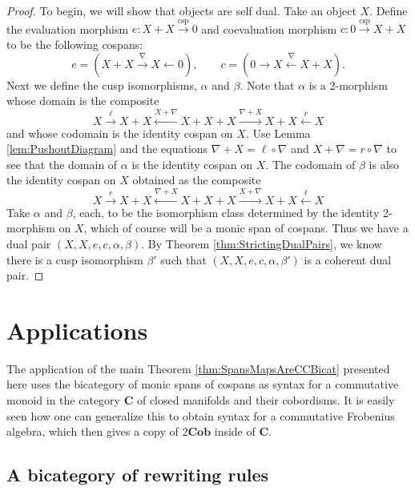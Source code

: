 \documentclass[11pt]{amsart}
\newcommand{\cat}[1]{\mathbf{#1}}
\newcommand{\from}{\colon}
\newcommand{\xto}[1]{\xrightarrow{#1}}
\newcommand{\tocospan}{\xrightarrow{\mathrm{csp}}}
\theoremstyle{remark}
\theoremstyle{definition}
\begin{document}
\begin{proof}
	To begin, we will show that objects are self dual. 
	Take an object $X$.  
	Define the evaluation morphism 
		$e \from X + X \tocospan 0$ 
	and coevaluation morphism 
		$c \from 0 \tocospan X+X$ 
	to be the following cospans:
	\[
		e = (X+X \xto{\nabla} X \gets 0), 
		\quad \quad 
		c = (0 \to X \xleftarrow{\nabla} X+X).
	\]
	Next we define the cusp isomorphisms, 
		$\alpha$ and $\beta$.
	Note that $\alpha$ is a 2-morphism 
	whose domain is the composite 
	\[
		X \xto{\ell}
		X+X \xleftarrow{X+\nabla}
		X+X+X \xto{\nabla +X}
		X+X \xleftarrow{r}
		X
	\]
	and whose codomain is the identity cospan on $X$.  
	Use Lemma \ref{lem:PushoutDiagram} 
	and the equations
		$\nabla+X = \ell \circ \nabla$ 
	and 
		$X + \nabla = r \circ \nabla$ 
	to see that the domain of $\alpha$ is 
	the identity cospan on $X$.  
	The codomain of $\beta$ is also 
	the identity cospan on $X$
	obtained as the composite 
	\[
		X \xto{r}
		X+X \xleftarrow{\nabla+X}
		X+X+X \xto{X+\nabla}
		X+X \xleftarrow{\ell}
		X
	\]
	Take $\alpha$ and $\beta$, each, 
	to be the isomorphism class determined by the identity 2-morphism on $X$, which of course will be a monic span of cospans.
	Thus we have a dual pair 
		$(X,X,e,c,\alpha,\beta)$. 
	By Theorem 
		\ref{thm:StrictingDualPairs}, 
	we know there is a cusp isomorphism $\beta'$ 
	such that 
		$(X,X,e,c,\alpha,\beta')$ 
	is a coherent dual pair.  
\end{proof}

\section{Applications} %
\label{sec:Applications}
The application of the main Theorem \ref{thm:SpansMapsAreCCBicat} presented here uses the bicategory of 
monic spans of cospans as syntax for a 
commutative monoid in the category $\cat{C}$ of 
closed manifolds and their cobordisms. 
It is easily seen how one can generalize this to 
obtain syntax for a commutative Frobenius algebra, 
which then gives a copy of $2\cat{Cob}$ inside of $\cat{C}$.   



\subsection{A bicategory of rewriting rules} %
\label{subsec:Rewrite}
\end{document}
